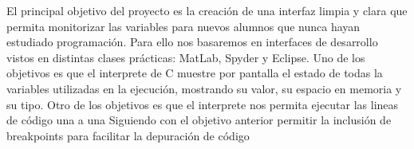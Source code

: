 
El principal objetivo del proyecto es la creación de una interfaz limpia y clara que permita monitorizar las variables para nuevos alumnos que nunca hayan estudiado programación. Para ello nos basaremos en interfaces de desarrollo vistos en distintas clases prácticas: MatLab, Spyder y Eclipse.
Uno de los objetivos es que el interprete de C muestre por pantalla el estado de todas la variables utilizadas en la ejecución, mostrando su valor, su espacio en memoria y su tipo.
Otro de los objetivos es que el interprete nos permita ejecutar las lineas de código una a una
Siguiendo con el objetivo anterior permitir la inclusión de breakpoints para facilitar la depuración de código